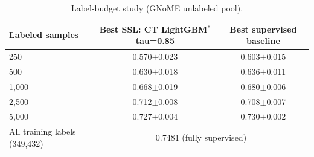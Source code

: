 \begin{table}[H]
\centering\small
\begin{tabular}{lcc}
\toprule
Labeled samples & Best SSL: CT LightGBM$^*$ tau=0.85 & Best supervised baseline\\
\midrule
250 & 0.570$\pm$0.023 & 0.603$\pm$0.015 \\
500 & 0.630$\pm$0.018 & 0.636$\pm$0.011 \\
1,000 & 0.668$\pm$0.019 & 0.680$\pm$0.006 \\
2,500 & 0.712$\pm$0.008 & 0.708$\pm$0.007 \\
5,000 & 0.727$\pm$0.004 & 0.730$\pm$0.002 \\
\midrule
All training labels (349,432) & \multicolumn{2}{c}{0.7481 (fully supervised)}\\
\bottomrule
\end{tabular}
\caption*{Label-budget study (GNoME unlabeled pool).}
\end{table}
